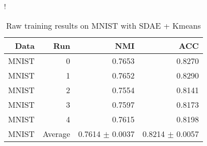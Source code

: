 \begin{table}[ht]
\caption{Raw training results on MNIST with SDAE + Kmeans}\label{tab:idec-raw-MNIST}
\resizebox{\columnwidth}!{
\begin{tabular}{ | r | r | r | r |}
\hline
Data & Run & NMI & ACC  \\ \hline 
MNIST & 0 & 0.7653 & 0.8270 \\ 
MNIST & 1 & 0.7652 & 0.8290 \\ \hdashline 
MNIST & 2 & 0.7554 & 0.8141 \\ 
MNIST & 3 & 0.7597 & 0.8173 \\ \hdashline 
MNIST & 4 & 0.7615 & 0.8198 \\ 
MNIST & Average & 0.7614 $\pm$ 0.0037 & 0.8214 $\pm$ 0.0057 \\ 
\hline
\end{tabular}
}
\end{table}